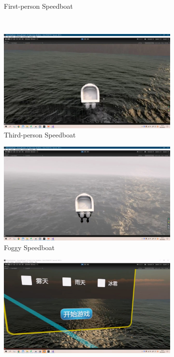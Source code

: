 \documentclass[a4paper,10pt]{article}
\begin{document}
\begin{figure}[htbp]
\begin{subfigure}{0.3\textwidth}
				\captionsetup{font=scriptsize}
				\caption{First-person Speedboat}
				\label{fig: First-person perspective-IP}	
			\end{subfigure}\\
			\begin{subfigure}{0.3\textwidth}
				\includegraphics[width=\linewidth]{picture/Third-person perspective rain-IP}
				\captionsetup{font=scriptsize}
				\caption{Third-person Speedboat}
				\label{fig: Third-person perspective rain-IP}	
			\end{subfigure}
			\begin{subfigure}{0.3\textwidth}
				\includegraphics[width=\linewidth]{picture/Third-person perspective-IP}
				\captionsetup{font=scriptsize}
				\caption{Foggy Speedboat}
				\label{fig: Third-person perspective-IP}	
			\end{subfigure}
			\begin{subfigure}{0.3\textwidth}
				\includegraphics[width=\linewidth]{picture/Main menu-IP}

\end{subfigure}
\end{figure}
\end{document}
